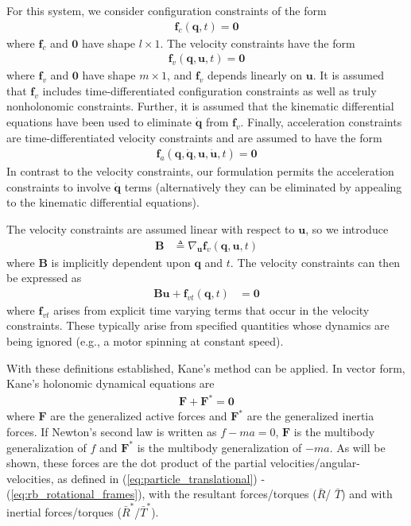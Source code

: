 \documentclass[smallcondensed,final]{svjour3}                     %
\begin{document}
For this system, we consider configuration constraints of the form
\begin{align}
\label{eq:configuration_constraints}
\mathbf{f}_c(\mathbf{q}, t) = \mathbf{0}
\end{align}
where $\mathbf{f}_c$ and $\mathbf{0}$ have shape $l \times 1$.  The velocity
constraints have the form
\begin{align}
\label{eq:velocity_constraints}
\mathbf{f}_v(\mathbf{q}, \mathbf{u}, t) = \mathbf{0}
\end{align}
where $\mathbf{f}_v$ and $\mathbf{0}$ have shape $m \times 1$, and
$\mathbf{f}_v$ depends linearly on $\mathbf{u}$.  It is assumed that
$\mathbf{f}_v$ includes time-differentiated configuration constraints as well
as truly nonholonomic constraints. Further, it is assumed that the kinematic
differential equations have been used to eliminate $\dot{\mathbf{q}}$ from
$\mathbf{f}_v$. Finally, acceleration constraints are time-differentiated
velocity constraints and are assumed to have the form
\begin{align}
\label{eq:acceleration_constraints}
\mathbf{f}_a(\mathbf{q}, \dot{\mathbf{q}}, \mathbf{u}, \dot{\mathbf{u}}, t) =
\mathbf{0}
\end{align}
In contrast to the velocity constraints, our formulation permits the
acceleration constraints to involve $\dot{\mathbf{q}}$ terms (alternatively
they can be eliminated by appealing to the kinematic differential equations).

The velocity constraints are assumed linear with respect to
$\mathbf{u}$, so we introduce
\begin{align}
\label{eq:constraint_B}
\mathbf{B} &\triangleq \nabla_{\mathbf{u}} \mathbf{f}_v (\mathbf{q}, \mathbf{u},
t)
\end{align}
where $\mathbf{B}$ is implicitly dependent upon $\mathbf{q}$ and $t$.  The velocity
constraints can then be expressed as
\begin{align}
\label{eq:constraint_Bu0}
\mathbf{B}\mathbf{u} + \mathbf{f}_{vt}(\mathbf{q}, t) &= \mathbf{0}
\end{align}
where $\mathbf{f}_{vt}$ arises from explicit time varying terms that occur in
the velocity constraints. These typically arise from specified quantities whose
dynamics are being ignored (e.g., a motor spinning at constant speed).

With these definitions established, Kane's method can be applied. In vector
form, Kane's holonomic dynamical equations are
\begin{align}
\label{eq:kanes_eq}
\mathbf{F} + \mathbf{F}^* = \mathbf{0}
\end{align}
where $\mathbf{F}$ are the generalized active forces and $\mathbf{F}^*$ are the
generalized inertia forces. If Newton's second law is written as $f - ma = 0$,
$\mathbf{F}$ is the multibody generalization of $f$ and $\mathbf{F}^*$ is the
multibody generalization of $-ma$. As will be shown, these forces are the dot
product of the partial velocities/angular-velocities, as defined in
(\ref{eq:particle_translational}) - (\ref{eq:rb_rotational_frames}), with the
resultant forces/torques ($\bar{R}$/ $\bar{T}$) and with inertial
forces/torques ($\bar{R}^*$/$\bar{T}^*$).
\end{document}
